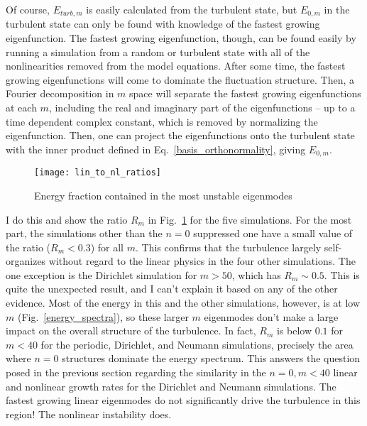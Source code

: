 Of course, $E_{turb,m}$ is easily calculated from the turbulent state, but $E_{0,m}$ in the 
turbulent state can only be found with knowledge of the fastest growing eigenfunction. The fastest growing eigenfunction, though, can be found easily by running a simulation from a random 
or turbulent state with all of the nonlinearities removed from the model equations. After some time, the fastest growing eigenfunctions will come to
dominate the fluctuation structure. Then, a Fourier decomposition in $m$ space will separate the fastest growing eigenfunctions at each $m$, including the real and imaginary part
of the eigenfunctions -- up to a time dependent complex constant, which is removed by normalizing the eigenfunction. Then, one can project the eigenfunctions onto the turbulent state
with the inner product defined in Eq.~\ref{basis_orthonormality}, giving $E_{0,m}$.

\begin{figure}
\centerline{\texttt{[image: lin\_to\_nl\_ratios]}}
\caption{Energy fraction contained in the most unstable eigenmodes}
\label{lin_to_nl_ratios}
\end{figure}

I do this and show the ratio $R_m$ in Fig.~\ref{lin_to_nl_ratios} for the five simulations. 
For the most part, the simulations other than the $n=0$ suppressed one have a small value of the ratio ($R_m < 0.3$) for all $m$. 
This confirms that the turbulence largely self-organizes without regard to the linear physics in the four other simulations. 
The one exception is the Dirichlet simulation for $m > 50$, which has $R_m \sim 0.5$. This is quite the unexpected result, and I can't explain it based on any of the other evidence.
Most of the energy in this and the other simulations, however, 
is at low $m$ (Fig.~\ref{energy_spectra}), so these larger $m$ eigenmodes don't make a large impact on the overall structure of the turbulence.
In fact, $R_m$ is below $0.1$ for $m<40$ for the periodic, Dirichlet, and Neumann simulations, precisely the area where
$n=0$ structures dominate the energy spectrum. This answers the question posed in the previous section regarding the similarity in the $n=0, m<40$ linear and nonlinear growth rates
for the Dirichlet and Neumann simulations. The fastest growing linear eigenmodes do not significantly drive the turbulence in this region! The nonlinear instability does.

